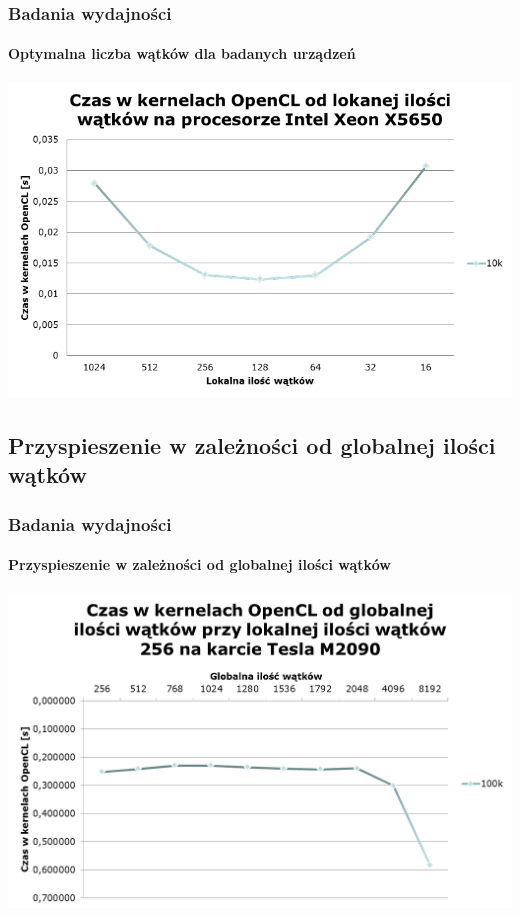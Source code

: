 \documentclass{beamer}
\begin{document}
\begin{frame}
\frametitle{Badania wydajności}
\framesubtitle{Optymalna liczba wątków dla badanych urządzeń}
\hfill\includegraphics[scale=0.35]{czas2.png}\hspace*{\fill}
\end{frame}

\subsection{Przyspieszenie w zależności od globalnej ilości wątków}

\begin{frame}
\frametitle{Badania wydajności}
\framesubtitle{Przyspieszenie w zależności od globalnej ilości wątków}
\hfill\includegraphics[scale=0.45]{czas3.png}\hspace*{\fill}
\end{frame}
\end{document}
